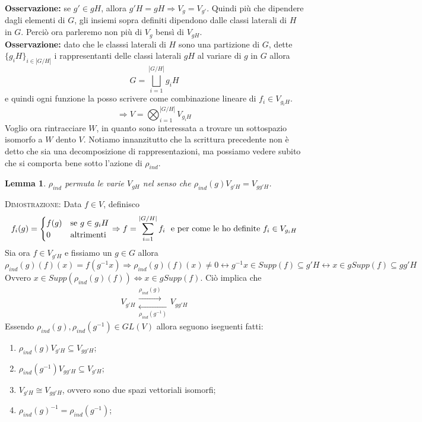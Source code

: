 \documentclass[11pt]{article}
\theoremstyle{plain}
\newtheorem{lemma}[thm]{Lemma}
\theoremstyle{definition}
\theoremstyle{remark}
\begin{document}
\textbf{Osservazione:} se $g'\in gH$, allora $g'H=gH\Rightarrow V_g=V_{g'}$. Quindi più che dipendere dagli elementi di $G$, gli insiemi sopra definiti dipendono dalle classi laterali di $H$ in $G$. Perciò ora parleremo non più di $V_g$ bensì di $V_{gH}$.\\
\textbf{Osservazione:} dato che le classsi laterali di $H$ sono una partizione di $G$, dette $\{g_iH\}_{i\in |G/H|}$ i rappresentanti delle classi laterali $gH$ al variare di $g$ in $G$ allora 
\[G=\bigsqcup_{i=1}^{|G/H|} g_iH\] 
e quindi ogni funzione la posso scrivere come combinazione lineare di $f_i\in V_{g_iH}$.
\[\Rightarrow V=\bigotimes_{i=1}^{|G/H|} V_{g_iH}\]
Voglio ora rintracciare $W$, in quanto sono interessata a trovare un sottospazio isomorfo a $W$ dento $V$. Notiamo innanzitutto che la scrittura precedente non è detto che sia una decomposizione di rappresentazioni, ma possiamo vedere subito che si comporta bene sotto l'azione di $\rho_{ind}$. 
\begin{lemma}
$\rho_{ind}$ permuta le varie $V_{gH}$ nel senso che $\rho_{ind}(g)V_{g'H}=V_{gg'H}$. 
\end{lemma}
\textsc{Dimostrazione:} Data $f\in V$, definisco
\[f_i(g)=\begin{cases}
f(g)& \textup{se } g\in g_iH\\
0& \textup{altrimenti}
\end{cases}\Rightarrow f=\sum_{i=1}^{|G/H|} f_i\ \textup{ e per come le ho definite } f_i\in V_{g_iH}\]
Sia ora $f\in V_{g'H}$ e fissiamo un $g\in G$ allora
\[\rho_{ind}(g)(f)(x)=f(g^{-1}x)\Rightarrow \rho_{ind}(g)(f)(x)\neq 0\leftrightarrow g^{-1}x\in Supp(f)\subseteq g'H\leftrightarrow x\in gSupp(f)\subseteq gg'H\]
Ovvero $x\in Supp(\rho_{ind}(g)(f))\Leftrightarrow x\in gSupp(f)$. Ciò implica che
\[ V_{g'H} \begin{matrix}
\overset{\rho_{ind}(g)}{\longrightarrow}\\ 
\underset{\rho_{ind}(g^{-1})}{\longleftarrow}
\end{matrix} V_{gg'H} \]
Essendo $\rho_{ind}(g),\rho_{ind}(g^{-1})\in GL(V)$ allora seguono iseguenti fatti:
\begin{enumerate}
\item $\rho_{ind}(g)V_{g'H}\subseteq V_{gg'H}$;
\item $\rho_{ind}(g^{-1})V_{gg'H}\subseteq V_{g'H}$;
\item $V_{g'H}\cong V_{gg'H}$, ovvero sono due spazi vettoriali isomorfi;
\item $\rho_{ind}(g)^{-1}=\rho_{ind}(g^{-1})$;
\end{enumerate}
\end{document}
